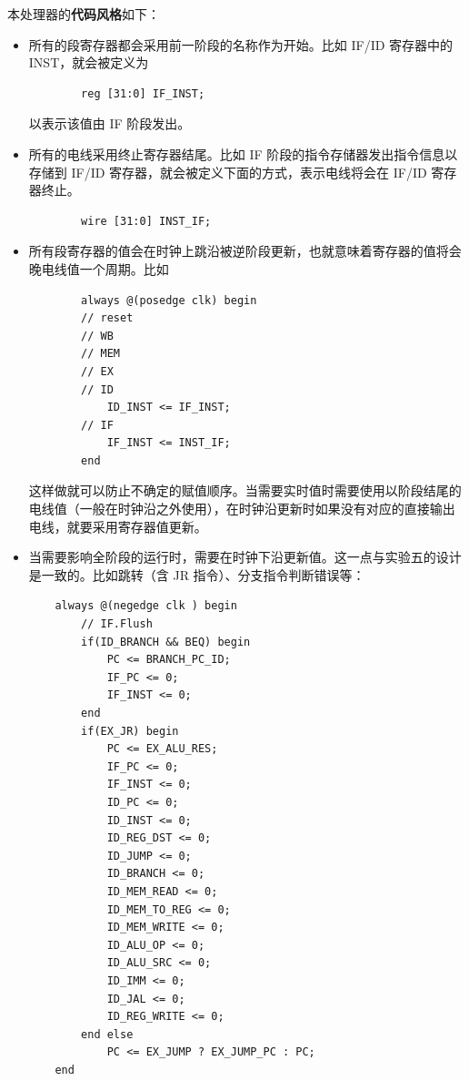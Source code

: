 \documentclass[a4paper,UTF8]{ctexart}
\begin{document}
本处理器的\textbf{代码风格}如下：
\begin{itemize}
    \item 所有的段寄存器都会采用前一阶段的名称作为开始。比如 IF/ID 寄存器中的 INST，就会被定义为
    \begin{lstlisting}
        reg [31:0] IF_INST;
    \end{lstlisting}
    以表示该值由 IF 阶段发出。
    \item 所有的电线采用终止寄存器结尾。比如 IF 阶段的指令存储器发出指令信息以存储到 IF/ID 寄存器，就会被定义下面的方式，表示电线将会在 IF/ID 寄存器终止。
    \begin{lstlisting}
        wire [31:0] INST_IF;
    \end{lstlisting}
    \item 所有段寄存器的值会在时钟上跳沿被逆阶段更新，也就意味着寄存器的值将会晚电线值一个周期。比如
    \begin{lstlisting}
        always @(posedge clk) begin
        // reset
        // WB
        // MEM
        // EX
        // ID
            ID_INST <= IF_INST;
        // IF
            IF_INST <= INST_IF;
        end
    \end{lstlisting}
    这样做就可以防止不确定的赋值顺序。当需要实时值时需要使用以阶段结尾的电线值（一般在时钟沿之外使用），在时钟沿更新时如果没有对应的直接输出电线，就要采用寄存器值更新。
    \item 当需要影响全阶段的运行时，需要在时钟下沿更新值。这一点与实验五的设计是一致的。比如跳转（含 JR 指令）、分支指令判断错误等：
    \begin{lstlisting}
    always @(negedge clk ) begin
        // IF.Flush
        if(ID_BRANCH && BEQ) begin
            PC <= BRANCH_PC_ID;
            IF_PC <= 0;
            IF_INST <= 0;
        end
        if(EX_JR) begin
            PC <= EX_ALU_RES;
            IF_PC <= 0;
            IF_INST <= 0;
            ID_PC <= 0;
            ID_INST <= 0;
            ID_REG_DST <= 0;
            ID_JUMP <= 0;
            ID_BRANCH <= 0;
            ID_MEM_READ <= 0;
            ID_MEM_TO_REG <= 0;
            ID_MEM_WRITE <= 0;
            ID_ALU_OP <= 0;
            ID_ALU_SRC <= 0;
            ID_IMM <= 0;
            ID_JAL <= 0;
            ID_REG_WRITE <= 0;
        end else
            PC <= EX_JUMP ? EX_JUMP_PC : PC;
    end
    \end{lstlisting}
\end{itemize}
\end{document}
